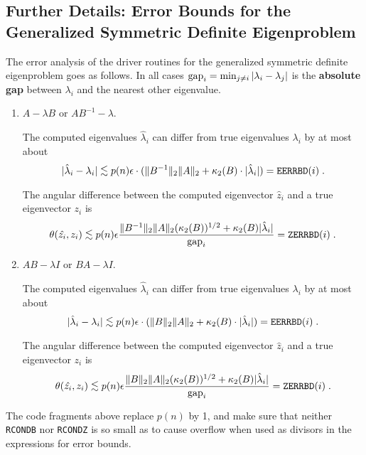 \subsection{Further Details:  Error Bounds for the Generalized Symmetric Definite
Eigenproblem}\label{secGSEPFurtherDetails}

The error analysis of the driver routines for the generalized symmetric definite
eigenproblem goes as follows.
In all cases
${\rm gap}_i = \min_{j \neq i} | \lambda_i - \lambda_j |$ is
the {\bf absolute gap}
between $\lambda_i$ and the nearest other eigenvalue.

\begin{enumerate}

\item $A - \lambda B$ or $A B^{-1} -\lambda$.

The computed eigenvalues $\hat{\lambda}_i$ can differ
from true eigenvalues $\lambda_i$ by at most about
\[
|\hat{\lambda}_i - \lambda_i | \leapproxeq p(n) \epsilon
\cdot ( \|B^{-1}\|_2 \|A\|_2  + \kappa_2 (B) \cdot | \hat{\lambda}_i | )
 = {\tt EERRBD}(i) \; .
\]

The angular difference between the computed eigenvector
$\hat{z}_i$ and a true eigenvector $z_i$ is
\[
\theta ( \hat{z_i} , z_i ) \leapproxeq
p(n) \epsilon
\frac{\|B^{-1} \|_2 \|A\|_2 ( \kappa_2 (B) )^{1/2}
+ \kappa_2 (B) | \hat{\lambda}_i |}
{ \gap_i } = {\tt ZERRBD}(i) \; .
\]

\item $AB - \lambda I$ or $BA - \lambda I$.

The computed eigenvalues $\hat{\lambda}_i$ can differ
from true eigenvalues $\lambda_i$ by at most about
\[
|\hat{\lambda}_i - \lambda_i | \leapproxeq p(n) \epsilon \cdot
( \|B\|_2 \|A\|_2 + \kappa_2 (B) \cdot | \hat{\lambda}_i | )
= {\tt EERRBD}(i) \; .
\]

The angular difference between the computed eigenvector
$\hat{z}_i$ and a true eigenvector $z_i$ is
\[
\theta ( \hat{z_i} ,  z_i ) \leapproxeq
p(n) \epsilon
\frac{\|B\|_2 \|A\|_2 ( \kappa_2 (B) )^{1/2}
+ \kappa_2 (B) | \hat{\lambda}_i |}
{\gap_i } = {\tt ZERRBD}(i) \; .
\]

\end{enumerate}

The code fragments above replace $p(n)$ by 1, and make sure that
neither {\tt RCONDB} nor {\tt RCONDZ} is so small as to cause
overflow when used as divisors in the expressions for error bounds.


